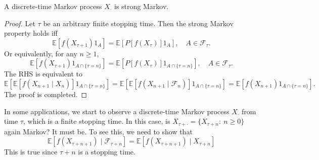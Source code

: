 \begin{theorem}
A discrete-time Markov process $X_{\cdot}$ is strong Markov.
\end{theorem}
\begin{proof}
Let $\tau$ be an arbitrary finite stopping time.
Then the strong Markov property holds iff 
\[
\mathbb{E}[f(X_{\tau+1})1_A] = \mathbb{E}[P[f(X_\tau)]1_A],\quad A\in\mathcal{F}_\tau.
\]
Or equivalently, for any $n\ge1$,
\[
\mathbb{E}[f(X_{\tau+1})1_{A\cap\{\tau=n\}}] = \mathbb{E}[P[f(X_\tau)]1_{A\cap\{\tau=n\}}],\quad A\in\mathcal{F}_\tau.
\]
The RHS is equivalent to
\[
\mathbb{E}[\mathbb{E}[f(X_{n+1}\mid X_n)]1_{A\cap\{\tau=n\}}]
=
\mathbb{E}[\mathbb{E}[f(X_{n+1}\mid \mathcal{F}_n)]1_{A\cap\{\tau=n\}}]
=\mathbb{E}[f(X_{n+1})1_{A\cap\{\tau=n\}}].
\]
The proof is completed.
\end{proof}

In some applications, we start to observe a discrete-time Markov process $X_{\cdot}$ from time $\tau$, which is a finite stopping time.
In this case, is $X_{\tau+\cdot}=\{X_{\tau+n}:~n\ge0\}$ again Markov?
It must be. To see this, we need to show that 
\[
\mathbb{E}[f(X_{\tau+n+1})\mid\mathcal{F}_{\tau+n}] = \mathbb{E}[f(X_{\tau+n+1})\mid X_{\tau+n}]
\]
This is true since $\tau+n$ is a stopping time.

